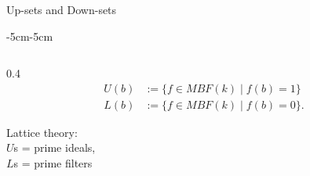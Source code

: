 \documentclass[aspectratio=169,9pt]{beamer}
\theoremstyle{definition}
\theoremstyle{remark}
\begin{document}
\begin{frame}{Up-sets and Down-sets}
\begin{adjustwidth}{-5cm}{-5cm}
\begin{columns}
    \begin{column}{0.4\textwidth}
        \begin{align*}
            U(b) &:=\{ f\in MBF(k) \;|\; f(b) = 1\} \\
            L(b) &:=\{ f\in MBF(k) \;|\; f(b) = 0\}.
        \end{align*}
        \vspace{0.5cm}
        
        \pause[3] Lattice theory: \\$U$s = prime ideals, \\$L$s = prime filters
        \vspace{0.5cm}
        

\end{column}
\end{columns}
\end{adjustwidth}
\end{frame}
\end{document}
